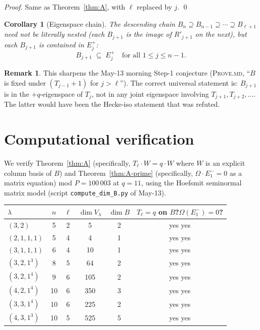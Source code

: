 \documentclass[11pt]{article}
\newtheorem{corollary}[theorem]{Corollary}
\theoremstyle{definition}
\newtheorem{remark}[theorem]{Remark}
\newcommand{\Om}{\Omega}
\begin{document}
\begin{proof}
Same as Theorem~\ref{thm:A}, with $\ell$ replaced by $j$. \qed
\end{proof}

\begin{corollary}[Eigenspace chain]\label{cor:eigenspace-chain}
The descending chain $B_n \supseteq B_{n-1} \supseteq \cdots \supseteq B_{\ell+1}$
need not be literally nested (each $B_{j+1}$ is the image of $R'_{j+1}$
on the next), but each $B_{j+1}$ is contained in $E_j^+$:
\[
   B_{j+1} \;\subseteq\; E_j^+ \quad\text{for all } 1 \le j \le n-1.
\]
\end{corollary}

\begin{remark}
This sharpens the May-13 morning Step-1 conjecture (\textsc{Prove.md},
``$B$ is fixed under $(T_{j-1}+1)$ for $j > \ell$''). The correct
universal statement is: $B_{j+1}$ is in the $+q$-eigenspace of $T_j$,
not in any joint eigenspace involving $T_{j+1}, T_{j+2}, \ldots$.
The latter would have been the Hecke-iso statement that was refuted.
\end{remark}

\section{Computational verification}\label{sec:verification}

We verify Theorem~\ref{thm:A} (specifically, $T_\ell \cdot W = q \cdot W$
where $W$ is an explicit column basis of $B$) and Theorem~\ref{thm:A-prime}
(specifically, $\Om \cdot E_1^- = 0$ as a matrix equation) mod
$P = 100\,003$ at $q = 11$, using the Hoefsmit seminormal matrix model
(script \texttt{compute\_dim\_B.py} of May-13).

\begin{center}
\renewcommand{\arraystretch}{1.15}
\begin{tabular}{l|c|c|c|c|c}
\toprule
$\lambda$ & $n$ & $\ell$ & $\dim V_\lambda$ & $\dim B$ & $T_\ell = q$ on $B$?\quad $\Om(E_1^-) = 0$? \\
\midrule
$(3,2)$        & 5  & 2 & 5   & 2 & yes \quad yes \\
$(2,1,1,1)$    & 5  & 4 & 4   & 1 & yes \quad yes \\
$(3,1,1,1)$    & 6  & 4 & 10  & 1 & yes \quad yes \\
$(3,2,1^3)$    & 8  & 5 & 64  & 2 & yes \quad yes \\
$(3,2,1^4)$    & 9  & 6 & 105 & 2 & yes \quad yes \\
$(4,2,1^4)$    & 10 & 6 & 350 & 3 & yes \quad yes \\
$(3,3,1^4)$    & 10 & 6 & 225 & 2 & yes \quad yes \\
$(4,3,1^3)$    & 10 & 5 & 525 & 5 & yes \quad yes \\
\bottomrule
\end{tabular}
\end{center}
\end{document}

